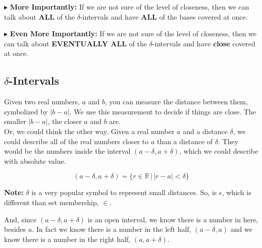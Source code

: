 \documentclass{ximera}
\begin{document}
\textbf{\textcolor{red!70!darkgray}{$\blacktriangleright$}} \textbf{\textcolor{purple!85!blue}{More Importantly:}} If we are not sure of the level of closeness, then we can talk about \textbf{\textcolor{red!70!black}{ALL}} of the $\delta$-intervals and have \textbf{\textcolor{red!70!black}{ALL}} of the bases covered at once.



\textbf{\textcolor{red!70!darkgray}{$\blacktriangleright$}} \textbf{\textcolor{purple!85!blue}{Even More Importantly:}} If we are not sure of the level of closeness, then we can talk about \textbf{\textcolor{red!70!black}{EVENTUALLY ALL}} of the $\delta$-intervals and have \textbf{\textcolor{red!70!black}{close}} covered at once.





















\subsection*{$\delta$-Intervals}



Given two real numbers, $a$ and $b$, you can measure the distance between them, symbolized by $|b-a|$.  We use this measurement to decide if things are close.  The smaller $|b-a|$, the closer $a$ and $b$ are. \\



Or, we could think the other way.  Given a real number $a$ and a distance $\delta$, we could describe all of the real numbers closer to $a$ than a distance of $\delta$.  They would be the numbers inside the interval $(a-\delta, a+\delta)$, which we could describe with absolute value.

\[      (a-\delta, a+\delta) = \{ r \in \mathbb{R} \, | \, |r - a| < \delta        \}       \]


\textbf{Note:}  $\delta$ is a very popular symbol to represent small distances.  So, is $\epsilon$, which is different than set membership, $\in$.



And, since $(a-\delta, a+\delta)$ is an open interval, we know there is a number in here, besides $a$.  In fact we know there is a number in the left half, $(a-\delta, a)$ and we know there is a number in the right half, $(a, a+\delta)$.
\end{document}
